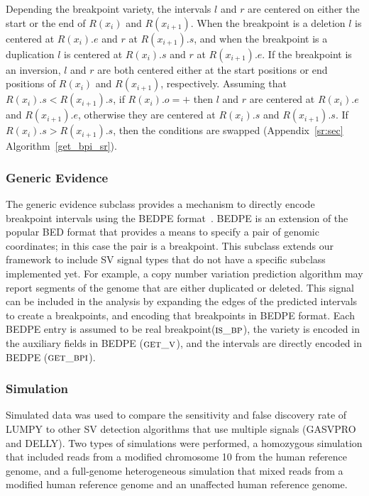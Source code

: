 \documentclass[10pt]{bmc_article}
\newenvironment{bmcformat}{\begin{raggedright}\baselineskip20pt\sloppy\setboolean{publ}{false}}{\end{raggedright}\baselineskip20pt\sloppy}
\begin{document}
\begin{bmcformat}
Depending the breakpoint variety, the intervals $l$ and $r$ are centered on
either the start or the end of $R(x_i)$ and $R(x_{i+1})$.  When the breakpoint
is a deletion $l$ is centered at $R(x_i).e$ and $r$ at $R(x_{i+1}).s$, and when
the breakpoint is a duplication $l$ is centered at $R(x_i).s$ and $r$ at
$R(x_{i+1}).e$.  If the breakpoint is an inversion, $l$ and $r$ are both
centered either at the start positions or end positions of $R(x_i)$ and
$R(x_{i+1})$, respectively.  Assuming that $R(x_i).s<R(x_{i+1}).s$, if
$R(x_i).o=+$ then $l$ and $r$ are centered at $R(x_i).e$ and  $R(x_{i+1}).e$,
otherwise they are centered at $R(x_i).s$ and  $R(x_{i+1}).s$.  If
$R(x_i).s>R(x_{i+1}).s$, then the conditions are swapped
(Appendix~\ref{sr:sec} Algorithm~\ref{get_bpi_sr}).

\subsubsection*{Generic Evidence}

The generic evidence subclass provides a mechanism to directly encode breakpoint
intervals using the BEDPE format~\cite{quinlan2010a}.  BEDPE is an extension of
the popular BED format that provides a means to specify a pair of genomic
coordinates; in this case the pair is a breakpoint.  This subclass extends our
framework to include SV signal types that do not have a specific subclass
implemented yet.  For example, a copy number variation prediction algorithm may
report segments of the genome that are either duplicated or deleted.  This
signal can be included in the analysis by expanding the edges of the predicted
intervals to create a breakpoints, and encoding that breakpoints in BEDPE
format.
Each BEDPE entry is assumed to be real breakpoint($\textsc{is\_bp}$), the
variety is encoded in the auxiliary fields in BEDPE ($\textsc{get\_v}$), and the
intervals are directly encoded in BEDPE ($\textsc{get\_bpi}$).


\subsubsection*{Simulation}
Simulated data was used to compare the sensitivity and false discovery rate of
LUMPY to other SV detection algorithms that use multiple signals (GASVPRO and
DELLY).   Two types of simulations were performed, a homozygous simulation that
included reads from a modified chromosome 10 from the human reference genome,
and a full-genome heterogeneous simulation that mixed reads from a modified
human reference genome and an unaffected human reference genome. 


\end{bmcformat}
\end{document}
